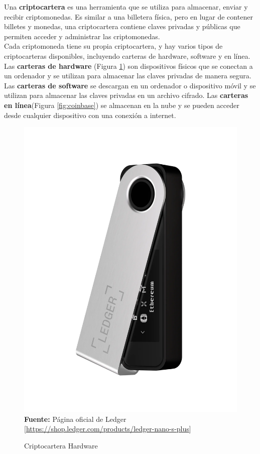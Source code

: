 \label{txt:wallet}
Una \textbf{criptocartera} es una herramienta que se utiliza para almacenar, 
enviar y recibir criptomonedas. Es similar a una billetera física, pero en 
lugar de contener billetes y monedas, una criptocartera contiene claves 
privadas y públicas que permiten acceder y administrar las criptomonedas.\\
\hfill \break
Cada criptomoneda tiene su propia criptocartera, y hay varios tipos de 
criptocarteras disponibles, incluyendo carteras de hardware, software y en 
línea. Las \textbf{carteras de hardware} (Figura \ref*{fig:ledger}) son dispositivos físicos que se conectan a 
un ordenador y se utilizan para almacenar las claves privadas de manera segura. 
Las \textbf{carteras de software} se descargan en un ordenador o dispositivo 
móvil y se utilizan para almacenar las claves privadas en un archivo cifrado. 
Las \textbf{carteras en línea}(Figura \ref*{fig:coinbase}) se almacenan en la nube y se pueden acceder 
desde cualquier dispositivo con una conexión a internet.
\begin{figure}[htb!]
    \caption{Criptocartera Hardware}
    \centering
    \label{fig:ledger}
    \includegraphics[scale=0.15]{./Ilustraciones/ledger-hardware.png}\\
    \textbf{Fuente:} Página oficial de Ledger [\url{https://shop.ledger.com/products/ledger-nano-s-plus}]
\end{figure}
